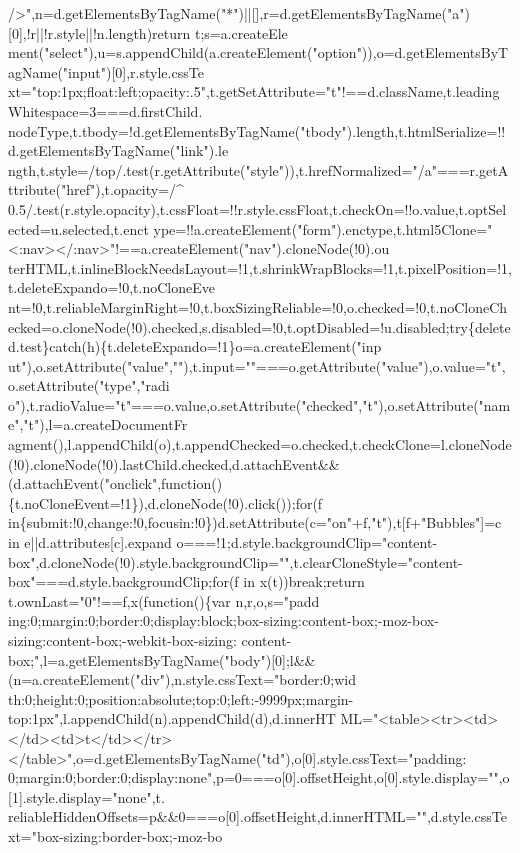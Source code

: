 \begin{DoxyCode}
{      />",n=d.getElementsByTagName("*")||[],r=d.getElementsByTagName("a")[0],!r||!r.style||!n.length)return
       t;s=a.createEle
      ment("select"),u=s.appendChild(a.createElement("option")),o=d.getElementsByTagName("input")[0],r.style.cssTe
      xt="top:1px;float:left;opacity:.5",t.getSetAttribute="t"!==d.className,t.leadingWhitespace=3===d.firstChild.
      nodeType,t.tbody=!d.getElementsByTagName("tbody").length,t.htmlSerialize=!!d.getElementsByTagName("link").le
      ngth,t.style=/top/.test(r.getAttribute("style")),t.hrefNormalized="/a"===r.getAttribute("href"),t.opacity=/^
      0.5/.test(r.style.opacity),t.cssFloat=!!r.style.cssFloat,t.checkOn=!!o.value,t.optSelected=u.selected,t.enct
      ype=!!a.createElement("form").enctype,t.html5Clone="<:nav></:nav>"!==a.createElement("nav").cloneNode(!0).ou
      terHTML,t.inlineBlockNeedsLayout=!1,t.shrinkWrapBlocks=!1,t.pixelPosition=!1,t.deleteExpando=!0,t.noCloneEve
      nt=!0,t.reliableMarginRight=!0,t.boxSizingReliable=!0,o.checked=!0,t.noCloneChecked=o.cloneNode(!0).checked,s.disabled=!0,t.optDisabled=!u.disabled;try\{delete
       d.test\}catch(h)\{t.deleteExpando=!1\}o=a.createElement("inp
      ut"),o.setAttribute("value",""),t.input=""===o.getAttribute("value"),o.value="t",o.setAttribute("type","radi
      o"),t.radioValue="t"===o.value,o.setAttribute("checked","t"),o.setAttribute("name","t"),l=a.createDocumentFr
      agment(),l.appendChild(o),t.appendChecked=o.checked,t.checkClone=l.cloneNode(!0).cloneNode(!0).lastChild.checked,d.attachEvent&&(d.attachEvent("onclick",function()\{t.noCloneEvent=!1\}),d.cloneNode(!0).click());for(f
       in\{submit:!0,change:!0,focusin:!0\})d.setAttribute(c="on"+f,"t"),t[f+"Bubbles"]=c in
       e||d.attributes[c].expand
      o===!1;d.style.backgroundClip="content-box",d.cloneNode(!0).style.backgroundClip="",t.clearCloneStyle="content-box"===d.style.backgroundClip;for(f in x(t))break;return t.ownLast="0"!==f,x(function()\{var
       n,r,o,s="padd
      ing:0;margin:0;border:0;display:block;box-sizing:content-box;-moz-box-sizing:content-box;-webkit-box-sizing:
      content-box;",l=a.getElementsByTagName("body")[0];l&&(n=a.createElement("div"),n.style.cssText="border:0;wid
      th:0;height:0;position:absolute;top:0;left:-9999px;margin-top:1px",l.appendChild(n).appendChild(d),d.innerHT
      ML="<table><tr><td></td><td>t</td></tr></table>",o=d.getElementsByTagName("td"),o[0].style.cssText="padding:
      0;margin:0;border:0;display:none",p=0===o[0].offsetHeight,o[0].style.display="",o[1].style.display="none",t.
      reliableHiddenOffsets=p&&0===o[0].offsetHeight,d.innerHTML="",d.style.cssText="box-sizing:border-box;-moz-bo
}
\end{DoxyCode}
